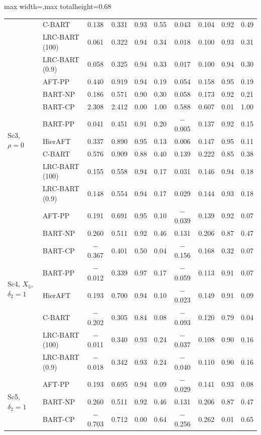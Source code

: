 \documentclass[11pt]{article}
\theoremstyle{definition}
\theoremstyle{plain}
\begin{document}
\begin{table}[htbp]
\begin{adjustbox}{max width=\textwidth,max totalheight=0.68\textheight}
\begin{tabular}{llcccccccc}
& C-BART & 0.138 & 0.331 & 0.93 & 0.55 & 0.043 & 0.104 & 0.92 & 0.49 \\
& LRC-BART (100) & 0.061 & 0.322 & 0.94 & 0.34 & 0.018 & 0.100 & 0.93 & 0.31 \\
& LRC-BART (0.9) & 0.058 & 0.325 & 0.94 & 0.33 & 0.017 & 0.100 & 0.94 & 0.30 \\
\midrule
\multirow{8}{*}{Sc3, $\rho=0$} & AFT-PP & 0.440 & 0.919 & 0.94 & 0.19 & 0.054 & 0.158 & 0.95 & 0.19 \\
& BART-NP & 0.186 & 0.571 & 0.90 & 0.30 & 0.058 & 0.173 & 0.92 & 0.21 \\
& BART-CP & 2.308 & 2.412 & 0.00 & 1.00 & 0.588 & 0.607 & 0.01 & 1.00 \\
& BART-PP & 0.041 & 0.451 & 0.91 & 0.20 & $-$0.005 & 0.137 & 0.92 & 0.15 \\
& HierAFT & 0.337 & 0.890 & 0.95 & 0.13 & 0.006 & 0.147 & 0.95 & 0.11 \\
& C-BART & 0.576 & 0.909 & 0.88 & 0.40 & 0.139 & 0.222 & 0.85 & 0.38 \\
& LRC-BART (100) & 0.155 & 0.558 & 0.94 & 0.17 & 0.031 & 0.146 & 0.94 & 0.18 \\
& LRC-BART (0.9) & 0.148 & 0.554 & 0.94 & 0.17 & 0.029 & 0.144 & 0.93 & 0.18 \\
\midrule
\multirow{8}{*}{Sc4, $X_5$, $\delta_2=1$} & AFT-PP & 0.191 & 0.691 & 0.95 & 0.10 & $-$0.039 & 0.139 & 0.92 & 0.07 \\
& BART-NP & 0.260 & 0.511 & 0.92 & 0.46 & 0.131 & 0.206 & 0.87 & 0.47 \\
& BART-CP & $-$0.367 & 0.401 & 0.50 & 0.04 & $-$0.156 & 0.168 & 0.32 & 0.07 \\
& BART-PP & $-$0.012 & 0.339 & 0.97 & 0.17 & $-$0.059 & 0.113 & 0.91 & 0.07 \\
& HierAFT & 0.193 & 0.700 & 0.94 & 0.10 & $-$0.023 & 0.149 & 0.91 & 0.09 \\
& C-BART & $-$0.202 & 0.305 & 0.84 & 0.08 & $-$0.093 & 0.120 & 0.79 & 0.04 \\
& LRC-BART (100) & $-$0.011 & 0.340 & 0.93 & 0.24 & $-$0.037 & 0.108 & 0.90 & 0.16 \\
& LRC-BART (0.9) & $-$0.018 & 0.342 & 0.93 & 0.24 & $-$0.040 & 0.110 & 0.90 & 0.16 \\
\midrule
\multirow{8}{*}{Sc5, $\delta_2=1$} & AFT-PP & 0.193 & 0.695 & 0.94 & 0.09 & $-$0.029 & 0.141 & 0.93 & 0.08 \\
& BART-NP & 0.260 & 0.511 & 0.92 & 0.46 & 0.131 & 0.206 & 0.87 & 0.47 \\
& BART-CP & $-$0.703 & 0.712 & 0.00 & 0.64 & $-$0.256 & 0.262 & 0.01 & 0.65 \\

\end{tabular}
\end{adjustbox}
\end{table}
\end{document}
